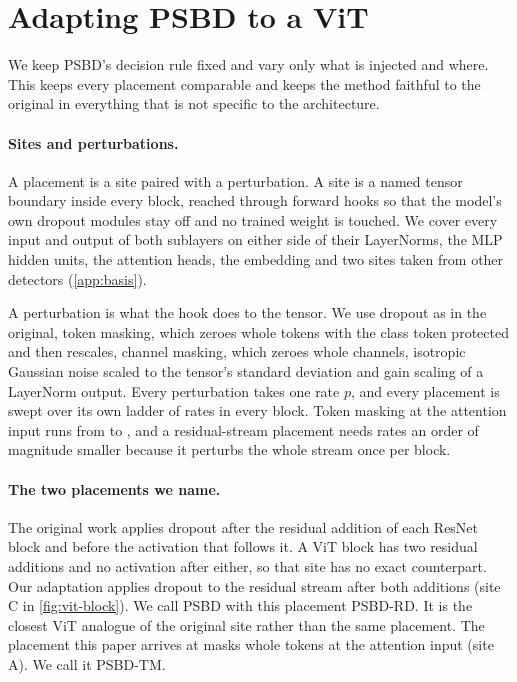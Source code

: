 \section{Adapting PSBD to a ViT}
\label{sec:method}

We keep PSBD's decision rule fixed and vary only what is injected and where. This keeps every placement comparable and keeps the method faithful to the original in everything that is not specific to the architecture.

\paragraph{Sites and perturbations.}
A placement is a site paired with a perturbation. A site is a named tensor boundary inside every block, reached through forward hooks so that the model's own dropout modules stay off and no trained weight is touched. We cover every input and output of both sublayers on either side of their LayerNorms, the MLP hidden units, the attention heads, the embedding and two sites taken from other detectors (\cref{app:basis}).

A perturbation is what the hook does to the tensor. We use dropout as in the original, token masking, which zeroes whole tokens with the class token protected and then rescales, channel masking, which zeroes whole channels, isotropic Gaussian noise scaled to the tensor's standard deviation and gain scaling of a LayerNorm output. Every perturbation takes one rate $p$, and every placement is swept over its own ladder of rates in every block. Token masking at the attention input runs from \RecommendedRateLadderLow{} to \RecommendedRateLadderHigh{}, and a residual-stream placement needs rates an order of magnitude smaller because it perturbs the whole stream once per block.

\paragraph{The two placements we name.}
The original work applies dropout after the residual addition of each ResNet block and before the activation that follows it. A ViT block has two residual additions and no activation after either, so that site has no exact counterpart. Our adaptation applies dropout to the residual stream after both additions (site C in \cref{fig:vit-block}). We call PSBD with this placement PSBD-RD. It is the closest ViT analogue of the original site rather than the same placement. The placement this paper arrives at masks whole tokens at the attention input (site A). We call it PSBD-TM.

